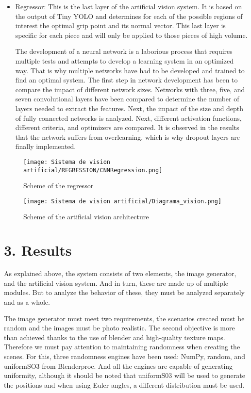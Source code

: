 {\begin{itemize}
\item Regressor: This is the last layer of the artificial vision system. It is based on the output of Tiny YOLO and determines for each of the possible regions of interest the optimal grip point and its normal vector. This last layer is specific for each piece and will only be applied to those pieces of high volume.

The development of a neural network is a laborious process that requires multiple tests and attempts to develop a learning system in an optimized way. That is why multiple networks have had to be developed and trained to find an optimal system. The first step in network development has been to compare the impact of different network sizes. Networks with three, five, and seven convolutional layers have been compared to determine the number of layers needed to extract the features. Next, the impact of the size and depth of fully connected networks is analyzed. Next, different activation functions, different criteria, and optimizers are compared. It is observed in the results that the network suffers from overlearning, which is why dropout layers are finally implemented.
\end{itemize}

\begin{figure}[ht]
	\centering
	\texttt{[image: Sistema de vision artificial/REGRESSION/CNNRegression.png]}
	\caption{Scheme of the regressor}
	\label{chap:Abstract fig:Estructura Regresor}
\end{figure}

\begin{figure}[ht]
	\centering
	\texttt{[image: Sistema de vision artificial/Diagrama\_vision.png]}
	\caption{Scheme of the artificial vision architecture}
	\label{chap:Abstract fig:Arquitectura sistema}
\end{figure}

\section*{3. Results}
As explained above, the system consists of two elements, the image generator, and the artificial vision system. And in turn, these are made up of multiple modules. But to analyze the behavior of these, they must be analyzed separately and as a whole.

The image generator must meet two requirements, the scenarios created must be random and the images must be photo realistic. The second objective is more than achieved thanks to the use of blender and high-quality texture maps. Therefore we must pay attention to maintaining randomness when creating the scenes. For this, three randomness engines have been used: NumPy, random, and uniformSO3 from Blenderproc. And all the engines are capable of generating uniformity, although it should be noted that uniformS03 will be used to generate the positions and when using Euler angles, a different distribution must be used.

}
